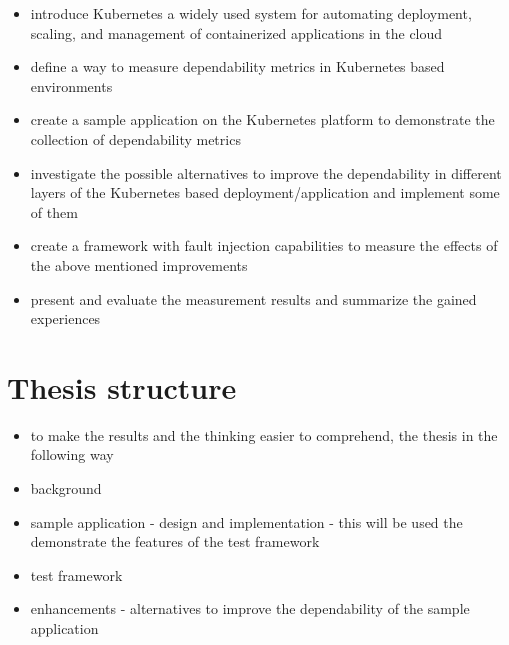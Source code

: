 \begin{itemize}
	\item introduce Kubernetes a widely used system for automating deployment, scaling, and management of containerized applications in the cloud
	\item define a way to measure dependability metrics in Kubernetes based environments
	\item create a sample application on the Kubernetes platform to demonstrate the collection of dependability metrics
	\item investigate the possible alternatives to improve the dependability in different layers of the Kubernetes based deployment/application and implement some of them
	\item create a framework with fault injection capabilities to measure the effects of the above mentioned improvements
	\item present and evaluate the measurement results and summarize the gained experiences
\end{itemize}

\section{Thesis structure}

\begin{itemize}
	\item to make the results and the thinking easier to comprehend, the thesis in the following way
	\item background
	\item sample application - design and implementation - this will be used the demonstrate the features of the test framework
	\item test framework
	\item enhancements - alternatives to improve the dependability of the sample application
\end{itemize}

























